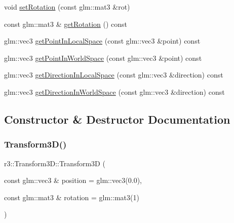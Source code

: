 \begin{DoxyCompactItemize}
void \mbox{\hyperlink{classr3_1_1_transform3_d_acaab6048f44805ef28fdae452f0c4853}{set\+Rotation}} (const glm\+::mat3 \&rot)
\item 
const glm\+::mat3 \& \mbox{\hyperlink{classr3_1_1_transform3_d_a1bad817e81d93f275ac71864fae763aa}{get\+Rotation}} () const
\item 
glm\+::vec3 \mbox{\hyperlink{classr3_1_1_transform3_d_a7c6348081c8c1b4d36af89fa7fe2103d}{get\+Point\+In\+Local\+Space}} (const glm\+::vec3 \&point) const
\item 
glm\+::vec3 \mbox{\hyperlink{classr3_1_1_transform3_d_a4ecfb0e1518fbeaaa838da02402d0bd9}{get\+Point\+In\+World\+Space}} (const glm\+::vec3 \&point) const
\item 
glm\+::vec3 \mbox{\hyperlink{classr3_1_1_transform3_d_ac942055c92499597d01b309b4068917e}{get\+Direction\+In\+Local\+Space}} (const glm\+::vec3 \&direction) const
\item 
glm\+::vec3 \mbox{\hyperlink{classr3_1_1_transform3_d_a16c5747e86d579935b808a15f4804b2f}{get\+Direction\+In\+World\+Space}} (const glm\+::vec3 \&direction) const
\end{DoxyCompactItemize}


\subsection{Constructor \& Destructor Documentation}
\mbox{\label{classr3_1_1_transform3_d_ab43888860ef5d5c124e185124cc681b5}} 
\subsubsection{\texorpdfstring{Transform3\+D()}{Transform3D()}}
{\footnotesize\ttfamily r3\+::\+Transform3\+D\+::\+Transform3D (\begin{DoxyParamCaption}\item[{const glm\+::vec3 \&}]{position = {\ttfamily glm\+:\+:vec3(0.0)},  }\item[{const glm\+::mat3 \&}]{rotation = {\ttfamily glm\+:\+:mat3(1)} }\end{DoxyParamCaption})\hspace{0.3cm}{\ttfamily [explicit]}}

\mbox{\label{classr3_1_1_transform3_d_acb2850307abbb9733d259dba96d5ec30}} 
